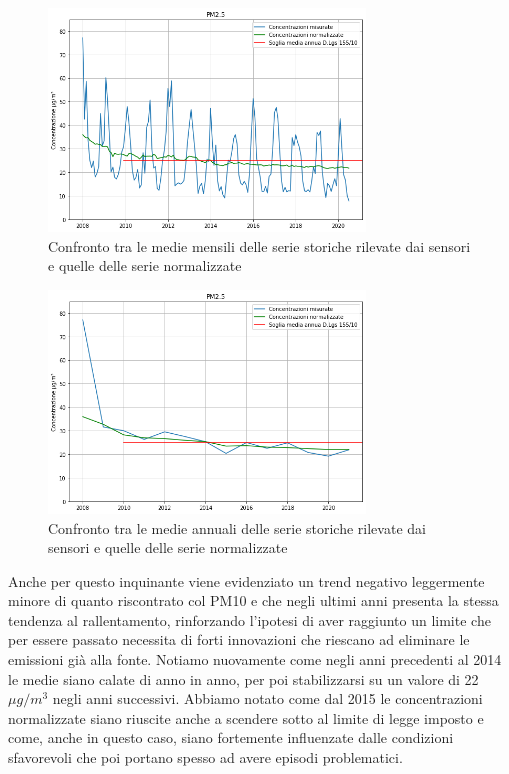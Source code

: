 \documentclass[a4paper]{report}
\begin{document}
\begin{figure}[h]
\centering
\includegraphics[width=0.75\textwidth]{pm25_medie_mensili}
\caption{Confronto tra le medie mensili delle serie storiche rilevate dai sensori e quelle delle serie normalizzate}
\label{fig:pm25_medie_mensili}
\end{figure}

\begin{figure}[h]
\centering
\includegraphics[width=0.75\textwidth]{pm25_medie_annuali}
\caption{Confronto tra le medie annuali delle serie storiche rilevate dai sensori e quelle delle serie normalizzate}
\label{fig:pm25_medie_annuali}
\end{figure}

Anche per questo inquinante viene evidenziato un trend negativo leggermente minore di quanto riscontrato col PM10 e che negli ultimi anni presenta la stessa tendenza al rallentamento, rinforzando l'ipotesi
di aver raggiunto un limite che per essere passato necessita di forti innovazioni che riescano ad eliminare le emissioni già alla fonte. Notiamo nuovamente come negli anni precedenti al 2014 le medie siano calate di anno in anno, per poi stabilizzarsi su un valore di 22$\mu g/m^3$ negli anni successivi.
Abbiamo notato come dal 2015 le concentrazioni normalizzate siano riuscite anche a scendere sotto al limite di legge imposto e come, anche in questo caso, siano fortemente influenzate dalle condizioni sfavorevoli che poi portano spesso ad avere episodi problematici.
\end{document}
